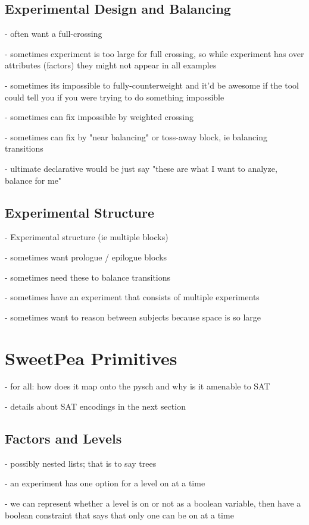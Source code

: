 \subsection{Experimental Design and Balancing}
- often want a full-crossing

- sometimes experiment is too large for full crossing, so while experiment has over attributes (factors) they might not appear in all examples

- sometimes its impossible to fully-counterweight and it'd be awesome if the tool could tell you if you were trying to do something impossible

- sometimes can fix impossible by weighted crossing

- sometimes can fix by "near balancing" or toss-away block, ie balancing transitions

- ultimate declarative would be just say "these are what I want to analyze, balance for me"

\subsection{Experimental Structure}
- Experimental structure (ie multiple blocks)

- sometimes want prologue / epilogue blocks

- sometimes need these to balance transitions

- sometimes have an experiment that consists of multiple experiments

- sometimes want to reason between subjects because space is so large


\section{SweetPea Primitives}

- for all: how does it map onto the pysch and why is it amenable to SAT

- details about SAT encodings in the next section

\subsection{Factors and Levels}
- possibly nested lists; that is to say trees

- an experiment has one option for a level on at a time

- we can represent whether a level is on or not as a boolean variable, then have a boolean constraint that says that only one can be on at a time

